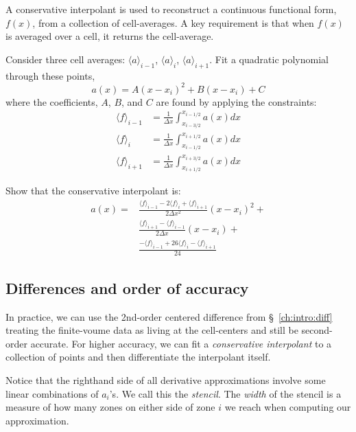 \begin{exercise}
{A conservative interpolant is used to reconstruct a continuous
  functional form, $f(x)$, from a collection of cell-averages.  A key
  requirement is that when $f(x)$ is averaged over a cell, it returns
  the cell-average.

Consider three cell averages: $\langle a \rangle_{i-1}$, $\langle a \rangle_{i}$, $\langle a \rangle_{i+1}$.  Fit a quadratic polynomial through these points,
 \begin{equation}
 a(x) = A (x - x_i)^2 + B (x - x_i) + C
 \end{equation}
 where the coefficients, $A$, $B$, and $C$ are found by applying the constraints:
 \begin{align}
 \langle f\rangle_{i-1} &= \frac{1}{\Delta x}
      \int_{x_{i-3/2}}^{x_{i-1/2}} a(x) dx \\
 \langle f\rangle_{i} &= \frac{1}{\Delta x}
      \int_{x_{i-1/2}}^{x_{i+1/2}} a(x) dx \\
 \langle f\rangle_{i+1} &= \frac{1}{\Delta x}
      \int_{x_{i+1/2}}^{x_{i+3/2}} a(x) dx 
 \end{align}

Show that the conservative interpolant is:
\begin{align}
a(x) = &\frac{\langle f\rangle_{i-1} - 2 \langle f\rangle_i +
             \langle f\rangle_{i+1}}{2\Delta x^2} (x-x_i)^2 + \nonumber \\
       &\frac{\langle f\rangle_{i+1} - \langle f\rangle_{i-1}}
            {2\Delta x} (x-x_i) + \nonumber \\
       &\frac{-\langle f\rangle_{i-1} + 26 \langle f\rangle_i
             -\langle f\rangle_{i+1}}{24}
\end{align}
}

\end{exercise}

\subsection{Differences and order of accuracy}

In practice, we can use the 2nd-order centered difference from
\S~\ref{ch:intro:diff} treating the finite-voume data as living at the
cell-centers and still be second-order accurate.  For higher accuracy,
we can fit a {\em conservative interpolant} to a collection of points 
and then differentiate the interpolant itself.

Notice that the righthand side of all derivative approximations involve
some linear combinations of $a_i$'s.  We call this the {\em stencil}.
The {\em width} of the stencil is a measure of how many zones on
either side of zone $i$ we reach when computing our approximation.

